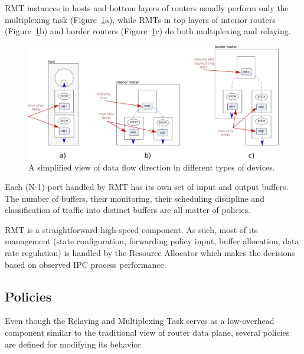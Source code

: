             RMT instances in hosts and bottom layers of routers usually perform only the multiplexing task (Figure~\ref{fig:rina:rmt:devices}a), while RMTs in top layers of interior routers (Figure~\ref{fig:rina:rmt:devices}b) and border routers (Figure~\ref{fig:rina:rmt:devices}c) do both multiplexing and relaying.

            \begin{figure}[H]
                \begin{center}
                    \includegraphics[width=\textwidth]{fig/fwding_rmt-devices.pdf}
                  \caption{A simplified view of data flow direction in different types of devices.}
                  \label{fig:rina:rmt:devices}
                \end{center}
            \end{figure}

            Each (N-1)-port handled by RMT has its own set of input and output buffers. The number of buffers, their monitoring, their scheduling discipline and classification of traffic into distinct buffers are all matter of policies.

            RMT is a straightforward high-speed component. As such, most of its management (state configuration, forwarding policy input, buffer allocation, data rate regulation) is handled by the Resource Allocator which makes the decisions based on observed IPC process performance.


        \subsection{Policies}

            Even though the Relaying and Multiplexing Task serves as a low-overhead component similar to the traditional view of router data plane, several policies are defined for modifying its behavior.

